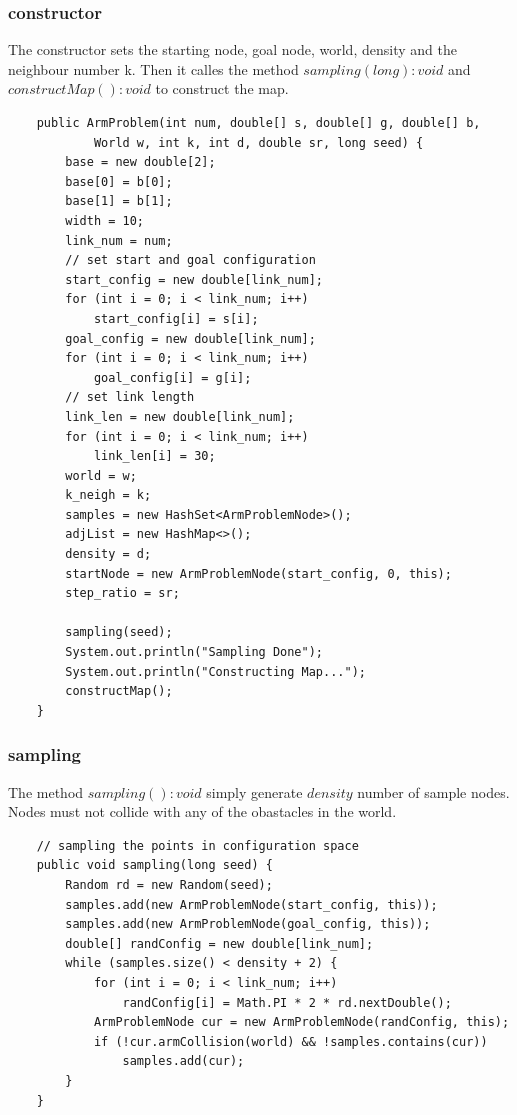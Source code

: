 \documentclass{article}
\begin{document}
\subsubsection{constructor}
The constructor sets the starting node, goal node, world, density and the neighbour number k. Then it calles the method $sampling(long) : void$ and $constructMap() : void$ to construct the map.
\begin{lstlisting}
	public ArmProblem(int num, double[] s, double[] g, double[] b, 
			World w, int k, int d, double sr, long seed) {
		base = new double[2];
		base[0] = b[0];
		base[1] = b[1];
		width = 10;
		link_num = num;
		// set start and goal configuration
		start_config = new double[link_num];
		for (int i = 0; i < link_num; i++)
			start_config[i] = s[i];
		goal_config = new double[link_num];
		for (int i = 0; i < link_num; i++)
			goal_config[i] = g[i];
		// set link length
		link_len = new double[link_num];
		for (int i = 0; i < link_num; i++)
			link_len[i] = 30;
		world = w;
		k_neigh = k;
		samples = new HashSet<ArmProblemNode>();
		adjList = new HashMap<>();
		density = d;
		startNode = new ArmProblemNode(start_config, 0, this);
		step_ratio = sr;

		sampling(seed);
		System.out.println("Sampling Done");
		System.out.println("Constructing Map...");
		constructMap();
	}
\end{lstlisting}

\subsubsection{sampling}
The method $sampling():void$ simply generate $density$ number of sample nodes. Nodes must not collide with any of the obastacles in the world.
\begin{lstlisting}
	// sampling the points in configuration space
	public void sampling(long seed) {
		Random rd = new Random(seed);
		samples.add(new ArmProblemNode(start_config, this));
		samples.add(new ArmProblemNode(goal_config, this));
		double[] randConfig = new double[link_num];
		while (samples.size() < density + 2) {
			for (int i = 0; i < link_num; i++)
				randConfig[i] = Math.PI * 2 * rd.nextDouble();
			ArmProblemNode cur = new ArmProblemNode(randConfig, this);
			if (!cur.armCollision(world) && !samples.contains(cur))
				samples.add(cur);
		}
	}
\end{lstlisting}
\end{document}
